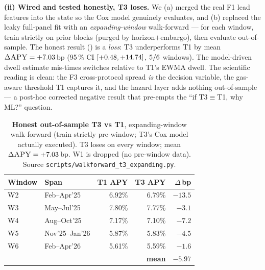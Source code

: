 \textbf{(ii) Wired and tested honestly, T3 loses.}  We (a) merged the
real F1 lead features into the state so the Cox model genuinely
evaluates, and (b) replaced the leaky full-panel fit with an
\emph{expanding-window} walk-forward --- for each window, train
strictly on prior blocks (purged by horizon$+$embargo), then
evaluate out-of-sample.  The honest result ()
is a \emph{loss}: T3 underperforms T1 by mean
$\Delta\textsc{APY} = +7.03$\,bp
(95\,\% CI $[+0.48, +14.74]$,
$5/6$ windows).  The model-driven dwell
estimate mis-times switches relative to T1's EWMA dwell.  The
scientific reading is clean: the F3 cross-protocol spread \emph{is}
the decision variable, the gas-aware threshold T1 captures it, and
the hazard layer adds nothing out-of-sample --- a post-hoc corrected
negative result that pre-empts the ``if T3$\equiv$T1, why ML?''
question.

\begin{table}[t]
  \centering
  \caption{\textbf{Honest out-of-sample T3 vs T1}, expanding-window
    walk-forward (train strictly pre-window; T3's Cox model actually
    executed).  T3 loses on every window; mean
    $\Delta\textsc{APY} = +7.03$\,bp.  W1 is dropped
    (no pre-window data). Source
    \texttt{scripts/walkforward\_t3\_expanding.py}.}
  \label{tab:wf-t3-vs-t1}
  \setlength{\tabcolsep}{4pt}
  \begin{tabular}{llrrr}
    \toprule
    Window & Span & T1 APY & T3 APY & $\Delta$\,bp \\
    \midrule
    W2 & Feb--Apr'25    & 6.92\% & 6.79\% & $-13.5$ \\
    W3 & May--Jul'25    & 7.80\% & 7.77\% & $-3.1$ \\
    W4 & Aug--Oct'25    & 7.17\% & 7.10\% & $-7.2$ \\
    W5 & Nov'25--Jan'26 & 5.87\% & 5.83\% & $-4.5$ \\
    W6 & Feb--Apr'26    & 5.61\% & 5.59\% & $-1.6$ \\
    \midrule
    \multicolumn{4}{r}{\textbf{mean}} & $\mathbf{-5.97}$ \\
    \bottomrule
  \end{tabular}
\end{table}


